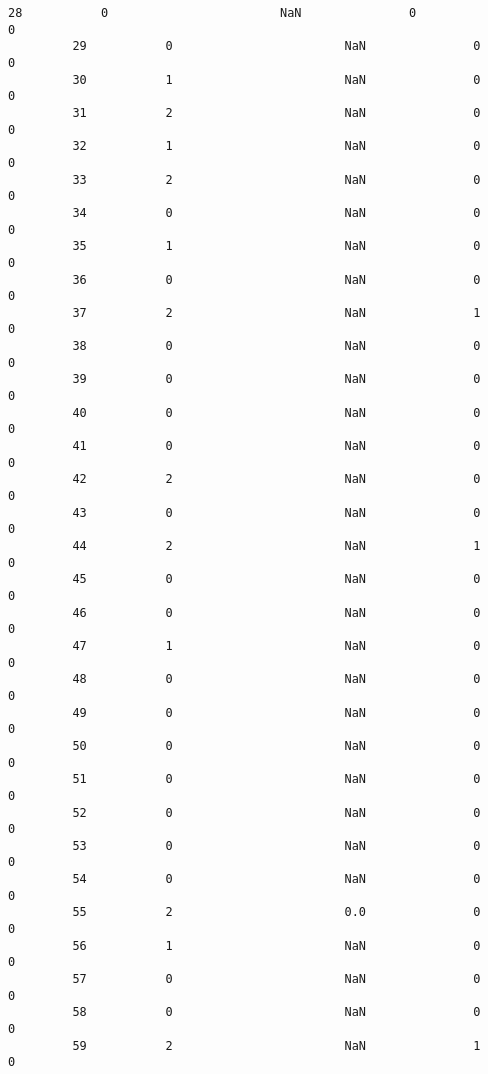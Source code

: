 \documentclass[11pt]{article}
\begin{document}
\begin{Verbatim}[commandchars=\\\{\}]
         28           0                        NaN               0                   0   
         29           0                        NaN               0                   0   
         30           1                        NaN               0                   0   
         31           2                        NaN               0                   0   
         32           1                        NaN               0                   0   
         33           2                        NaN               0                   0   
         34           0                        NaN               0                   0   
         35           1                        NaN               0                   0   
         36           0                        NaN               0                   0   
         37           2                        NaN               1                   0   
         38           0                        NaN               0                   0   
         39           0                        NaN               0                   0   
         40           0                        NaN               0                   0   
         41           0                        NaN               0                   0   
         42           2                        NaN               0                   0   
         43           0                        NaN               0                   0   
         44           2                        NaN               1                   0   
         45           0                        NaN               0                   0   
         46           0                        NaN               0                   0   
         47           1                        NaN               0                   0   
         48           0                        NaN               0                   0   
         49           0                        NaN               0                   0   
         50           0                        NaN               0                   0   
         51           0                        NaN               0                   0   
         52           0                        NaN               0                   0   
         53           0                        NaN               0                   0   
         54           0                        NaN               0                   0   
         55           2                        0.0               0                   0   
         56           1                        NaN               0                   0   
         57           0                        NaN               0                   0   
         58           0                        NaN               0                   0   
         59           2                        NaN               1                   0   
         

\end{Verbatim}
\end{document}
